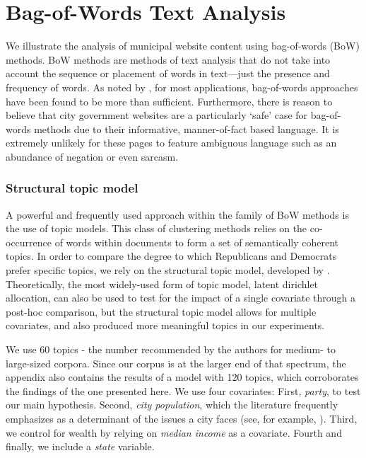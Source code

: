 \documentclass[11pt]{article}
\begin{document}
\section{Bag-of-Words Text Analysis}


We illustrate the analysis of municipal website content using bag-of-words (BoW) methods. BoW methods are methods of text analysis that do not take into account the sequence or placement of words in text---just the presence and frequency of words. As noted by \cite{GrimmerStewart2013}, for most applications, bag-of-words approaches have been found to be more than sufficient. Furthermore, there is reason to believe that city government websites are a particularly `safe' case for bag-of-words methods due to their informative, manner-of-fact based language. It is extremely unlikely for these pages to feature ambiguous language such as an abundance of negation or even sarcasm.

\subsubsection{Structural topic model}
A powerful and frequently used approach within the family of BoW methods is the use of topic models. This class of clustering methods relies on the co-occurrence of words within documents to form a set of semantically coherent topics. In order to compare the degree to which Republicans and Democrats prefer specific topics, we rely on the structural topic model, developed by \citep{Roberts2014}. Theoretically, the most widely-used form of topic model, latent dirichlet allocation, can also be used to test for the impact of a single covariate through a post-hoc comparison, but the structural topic model allows for multiple covariates, and also produced more meaningful topics in our experiments.

We use 60 topics - the number recommended by the authors for medium- to large-sized corpora. Since our corpus is at the larger end of that spectrum, the appendix also contains the results of a model with 120 topics, which corroborates the findings of the one presented here. We use four covariates: First, \textit{party}, to test our main hypothesis. Second, \textit{city population}, which the literature frequently emphasizes as a determinant of the issues a city faces (see, for example, \cite{Guillamon2013}). Third, we control for wealth by relying on \textit{median income} as a covariate. Fourth and finally, we include a \textit{state} variable.
\end{document}
